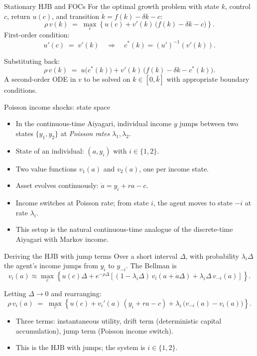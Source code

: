 \documentclass[10pt,english,aspectratio=169]{beamer}
\begin{document}
\begin{frame}{Stationary HJB and FOCs}
For the optimal growth problem with state $k$, control $c$, return $u(c)$, and transition $\dot k = f(k) - \delta k - c$:
\[
\rho\, v(k) \;=\; \max_c\!\left\{u(c) + v'(k)\,\big(f(k)-\delta k - c\big)\right\}.
\]
\medskip
First-order condition:
\[
u'(c) \;=\; v'(k) \quad\Longrightarrow\quad c^*(k) = (u')^{-1}(v'(k)).
\]
\medskip

Substituting back:
\[
\rho\, v(k) \;=\; u\!\big(c^*(k)\big) + v'(k)\,\big(f(k) - \delta k - c^*(k)\big).
\]
\medskip
A second-order ODE in $v$ to be solved on $k \in [0, \bar k]$ with appropriate boundary conditions.
\end{frame}

\begin{frame}{Poisson income shocks: state space}
\begin{itemize}
\item In the continuous-time Aiyagari, individual income $y$ jumps between two states $\{y_1, y_2\}$ at \emph{Poisson rates} $\lambda_1, \lambda_2$.
\medskip
\item State of an individual: $(a, y_i)$ with $i \in \{1,2\}$.
\medskip
\item Two value functions $v_1(a)$ and $v_2(a)$, one per income state.
\medskip
\item Asset evolves continuously: $\dot a = y_i + r a - c$.
\medskip
\item Income switches at Poisson rate; from state $i$, the agent moves to state $-i$ at rate $\lambda_i$.
\medskip
\item This setup is the natural continuous-time analogue of the discrete-time Aiyagari with Markov income.
\end{itemize}
\end{frame}

\begin{frame}{Deriving the HJB with jump terms}
Over a short interval $\Delta$, with probability $\lambda_i \Delta$ the agent's income jumps from $y_i$ to $y_{-i}$. The Bellman is
\[
v_i(a) \approx \max_c\!\left\{u(c)\Delta + e^{-\rho\Delta}\!\left[(1-\lambda_i\Delta)\, v_i(a + \dot a\Delta) + \lambda_i\Delta\, v_{-i}(a)\right]\right\}.
\]
\medskip

Letting $\Delta \to 0$ and rearranging:
\[
\rho\, v_i(a) \;=\; \max_c\!\left\{u(c) + v_i'(a)\,(y_i + r a - c) + \lambda_i\,\big(v_{-i}(a) - v_i(a)\big)\right\}.
\]
\medskip
\begin{itemize}
\item Three terms: instantaneous utility, drift term (deterministic capital accumulation), jump term (Poisson income switch).
\item This is the HJB with jumps; the system is $i \in \{1,2\}$.
\end{itemize}
\end{frame}
\end{document}
